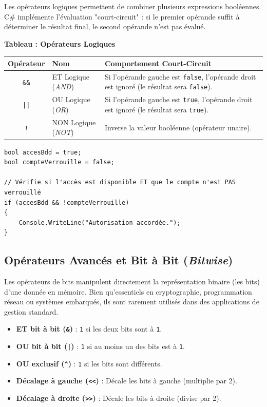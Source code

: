 Les opérateurs logiques permettent de combiner plusieurs expressions booléennes. C\# implémente l'évaluation "court-circuit" : si le premier opérande suffit à déterminer le résultat final, le second opérande n'est pas évalué.

\begin{center}
    \textbf{Tableau : Opérateurs Logiques} \\[0.3cm]
    \begin{tabular}{@{}clp{9cm}@{}}
        \toprule
        \textbf{Opérateur} & \textbf{Nom} & \textbf{Comportement Court-Circuit} \\
        \midrule
        \texttt{\&\&} & ET Logique (\emph{AND}) & Si l'opérande gauche est \texttt{false}, l'opérande droit est ignoré (le résultat sera \texttt{false}). \\
        \texttt{||} & OU Logique (\emph{OR}) & Si l'opérande gauche est \texttt{true}, l'opérande droit est ignoré (le résultat sera \texttt{true}). \\
        \texttt{!} & NON Logique (\emph{NOT}) & Inverse la valeur booléenne (opérateur unaire). \\
        \bottomrule
    \end{tabular}
\end{center}

\begin{lstlisting}[caption={Évaluation logique conditionnelle}]
bool accesBdd = true;
bool compteVerrouille = false;

// Vérifie si l'accès est disponible ET que le compte n'est PAS verrouillé
if (accesBdd && !compteVerrouille)
{
    Console.WriteLine("Autorisation accordée.");
}
\end{lstlisting}

\subsection{Opérateurs Avancés et Bit à Bit (\emph{Bitwise})}

Les opérateurs de bits manipulent directement la représentation binaire (les bits) d'une donnée en mémoire. Bien qu'essentiels en cryptographie, programmation réseau ou systèmes embarqués, ils sont rarement utilisés dans des applications de gestion standard.

\begin{itemize}
    \item \textbf{ET bit à bit (\texttt{\&})} : \texttt{1} si les deux bits sont à \texttt{1}.
    \item \textbf{OU bit à bit (\texttt{|})} : \texttt{1} si au moins un des bits est à \texttt{1}.
    \item \textbf{OU exclusif (\texttt{\textasciicircum})} : \texttt{1} si les bits sont différents.
    \item \textbf{Décalage à gauche (\texttt{<<})} : Décale les bits à gauche (multiplie par 2).
    \item \textbf{Décalage à droite (\texttt{>>})} : Décale les bits à droite (divise par 2).
\end{itemize}

